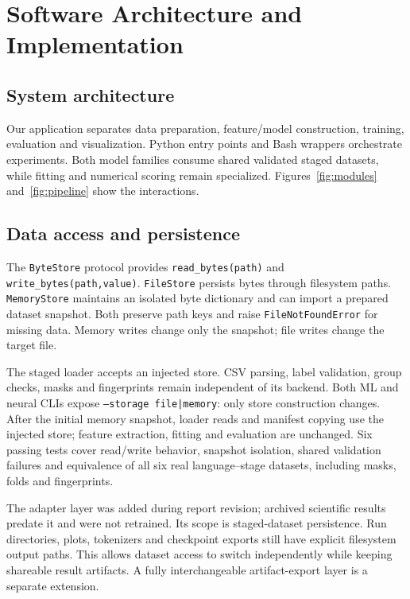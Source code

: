 \section{Software Architecture and Implementation}
\subsection{System architecture}
Our application separates data preparation, feature/model construction, training, evaluation and visualization. Python entry points and Bash wrappers orchestrate experiments. Both model families consume shared validated staged datasets, while fitting and numerical scoring remain specialized. Figures~\ref{fig:modules} and~\ref{fig:pipeline} show the interactions.

\subsection{Data access and persistence}
The \texttt{ByteStore} protocol provides \texttt{read\_bytes(path)} and \texttt{write\_bytes(path,value)}. \texttt{FileStore} persists bytes through filesystem paths. \texttt{MemoryStore} maintains an isolated byte dictionary and can import a prepared dataset snapshot. Both preserve path keys and raise \texttt{FileNotFoundError} for missing data. Memory writes change only the snapshot; file writes change the target file.

The staged loader accepts an injected store. CSV parsing, label validation, group checks, masks and fingerprints remain independent of its backend. Both ML and neural CLIs expose \texttt{--storage file|memory}: only store construction changes. After the initial memory snapshot, loader reads and manifest copying use the injected store; feature extraction, fitting and evaluation are unchanged. Six passing tests cover read/write behavior, snapshot isolation, shared validation failures and equivalence of all six real language--stage datasets, including masks, folds and fingerprints.

The adapter layer was added during report revision; archived scientific results predate it and were not retrained. Its scope is staged-dataset persistence. Run directories, plots, tokenizers and checkpoint exports still have explicit filesystem output paths. This allows dataset access to switch independently while keeping shareable result artifacts. A fully interchangeable artifact-export layer is a separate extension.

